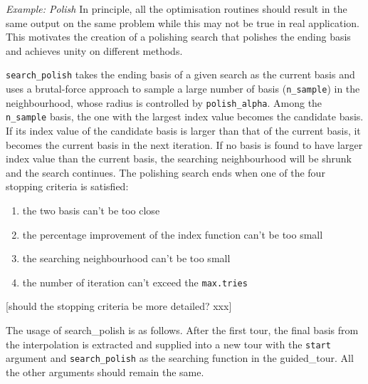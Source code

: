 \documentclass[12pt]{article}
\providecommand{\tightlist}{%
  \setlength{\itemsep}{0pt}\setlength{\parskip}{0pt}}
\begin{document}
\emph{Example: Polish} In principle, all the optimisation routines
should result in the same output on the same problem while this may not
be true in real application. This motivates the creation of a polishing
search that polishes the ending basis and achieves unity on different
methods.

\texttt{search\_polish} takes the ending basis of a given search as the
current basis and uses a brutal-force approach to sample a large number
of basis (\texttt{n\_sample}) in the neighbourhood, whose radius is
controlled by \texttt{polish\_alpha}. Among the \texttt{n\_sample}
basis, the one with the largest index value becomes the candidate basis.
If its index value of the candidate basis is larger than that of the
current basis, it becomes the current basis in the next iteration. If no
basis is found to have larger index value than the current basis, the
searching neighbourhood will be shrunk and the search continues. The
polishing search ends when one of the four stopping criteria is
satisfied:

\begin{enumerate}
\def\labelenumi{\arabic{enumi})}
\tightlist
\item
  the two basis can't be too close
\item
  the percentage improvement of the index function can't be too small
\item
  the searching neighbourhood can't be too small
\item
  the number of iteration can't exceed the \texttt{max.tries}
\end{enumerate}

{[}should the stopping criteria be more detailed? xxx{]}

The usage of search\_polish is as follows. After the first tour, the
final basis from the interpolation is extracted and supplied into a new
tour with the \texttt{start} argument and \texttt{search\_polish} as the
searching function in the guided\_tour. All the other arguments should
remain the same.
\end{document}
